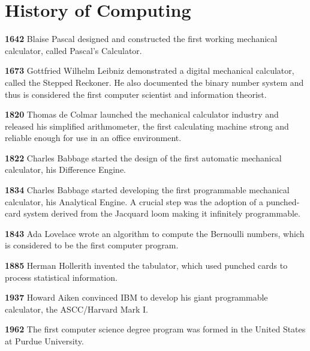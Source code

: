 \documentclass[8pt,a4paper,compress]{beamer}
\begin{document}
\section{History of Computing}
\begin{frame}[fragile]
\pause

\textbf{1642} Blaise Pascal designed and constructed the first working mechanical calculator, called Pascal's Calculator.

\pause
\smallskip

\textbf{1673} Gottfried Wilhelm Leibniz demonstrated a digital mechanical calculator, called the Stepped Reckoner. He also documented the binary number system and thus is considered the first computer scientist and information theorist.

\pause
\smallskip

\textbf{1820} Thomas de Colmar launched the mechanical calculator industry and released his simplified arithmometer, the first calculating machine strong and reliable enough for use in an office environment.

\pause
\smallskip

\textbf{1822} Charles Babbage started the design of the first automatic mechanical calculator, his Difference Engine.

\pause
\smallskip

\textbf{1834} Charles Babbage started developing the first programmable mechanical calculator, his Analytical Engine. A crucial step was the adoption of a punched-card system derived from the Jacquard loom making it infinitely programmable.

\pause
\smallskip

\textbf{1843} Ada Lovelace wrote an algorithm to compute the Bernoulli numbers, which is considered to be the first computer program.

\pause
\smallskip

\textbf{1885} Herman Hollerith invented the tabulator, which used punched cards to process statistical information.

\pause
\smallskip

\textbf{1937} Howard Aiken convinced IBM to develop his giant programmable calculator, the ASCC/Harvard Mark I.

\pause
\smallskip

\textbf{1962} The first computer science degree program was formed in the United States at Purdue University. 
\end{frame}
\end{document}
